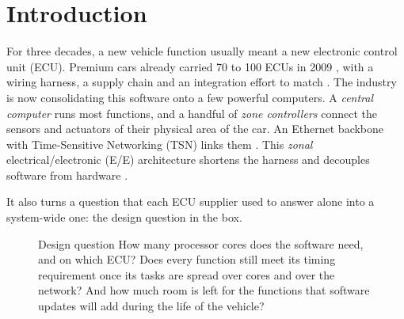 \section{Introduction}
\label{sec:introduction}

For three decades, a new vehicle function usually meant a new electronic
control unit (ECU). Premium cars already carried 70 to 100 ECUs in 2009
\cite{charette2009car}, with a wiring harness, a supply chain and an
integration effort to match \cite{bandur2021centralized,
askaripoor2022synthesis}. The industry is now consolidating this software
onto a few powerful computers. A \emph{central computer} runs most
functions, and a handful of \emph{zone controllers} connect the sensors and
actuators of their physical area of the car. An Ethernet backbone with
Time-Sensitive Networking (TSN) links them \cite{lobello2019perspective,
ieee8021q2022}. This \emph{zonal} electrical/electronic (E/E) architecture
shortens the harness and decouples software from hardware
\cite{bandur2021centralized,mauser2025centralization}.

It also turns a question that each ECU supplier used to answer alone into
a system-wide one: the design question in the box.
\begin{figure}[t]
\begin{keybox}[unbreakable,before skip=0pt,after skip=0pt]{Design question}
How many processor cores does the software need, and on which ECU? Does
every function still meet its timing requirement once its tasks are spread
over cores and over the network? And how much room is left for the
functions that software updates will add during the life of the vehicle?
\end{keybox}
\end{figure}

